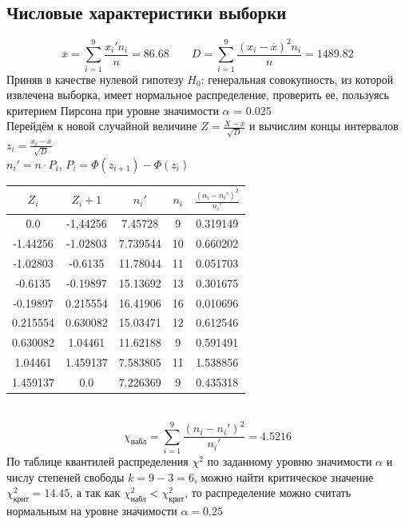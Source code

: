 \documentclass[12pt,a4paper]{report}
\begin{document}
\subsection*{Числовые характеристики выборки}
$$\overline{x}=\sum_{i=1}^{9}\frac{x_i'n_i}{n}=86.68\qquad D=\sum_{i=1}^{9}\frac{(x_i-\overline{x})^2n_i}{n}=1489.82$$
Приняв в качестве нулевой гипотезу $H_0$: генеральная совокупность, из которой извлечена выборка, имеет нормальное распределение, проверить ее, пользуясь критерием Пирсона при уровне значимости $\alpha$ = 0.025\\
\hfill\break
Перейдём к новой случайной величине $Z=\frac{X-\overline{x}}{\sqrt{D}}$ и вычислим концы интервалов $z_i=\frac{x_i-\overline{x}}{\sqrt{D}}$\\
\hfill\break
$n_i'=n\cdot P_i$, $P_i=\Phi(z_{i + 1})-\Phi(z_i)$\\
\hfill\break
\begin{tabular}{|c|c|c|c|c|}
	\hline
	$Z_i$    & $Z_i + 1$ & $n_i'$   & $n_i$ & $\frac{(n_i-n_i')^2}{n_i'}$ \\
	\hline
	0.0      & -1,44256  & 7.45728  & 9     & 0.319149                    \\
	\hline
	-1.44256 & -1.02803  & 7.739544 & 10    & 0.660202                    \\
	\hline
	-1.02803 & -0.6135   & 11.78044 & 11    & 0.051703                    \\
	\hline
	-0.6135  & -0.19897  & 15.13692 & 13    & 0.301675                    \\
	\hline
	-0.19897 & 0.215554  & 16.41906 & 16    & 0.010696                    \\
	\hline
	0.215554 & 0.630082  & 15.03471 & 12    & 0.612546                    \\
	\hline
	0.630082 & 1.04461   & 11.62188 & 9     & 0.591491                    \\
	\hline
	1.04461  & 1.459137  & 7.583805 & 11    & 1.538856                    \\
	\hline
	1.459137 & 0.0       & 7.226369 & 9     & 0.435318                    \\
	\hline
\end{tabular}\\
\hfill\break
$$\chi_{\text{набл}}=\sum_{i=1}^9\frac{(n_i-n_i')^2}{n_i'}=4.5216$$
По таблице квантилей распределения $\chi^2$ по заданному уровню значимости $\alpha$ и числу степеней свободы $k=9-3=6$, можно найти критическое значение $\chi^2_\text{крит}=14.45$, а так как $\chi^2_\text{набл}<\chi^2_\text{крит}$, то распределение можно считать нормальным на уровне значимости $\alpha=0.25$
\end{document}
